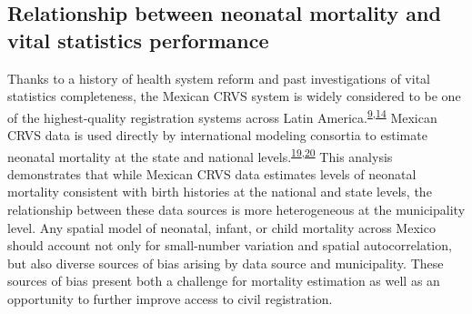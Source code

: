 \documentclass[
]{article}
\begin{document}
\hypertarget{relationship-between-neonatal-mortality-and-vital-statistics-performance}{%
\subsection{Relationship between neonatal mortality and vital statistics performance}\label{relationship-between-neonatal-mortality-and-vital-statistics-performance}}

Thanks to a history of health system reform and past investigations of vital statistics completeness, the Mexican CRVS system is widely considered to be one of the highest-quality registration systems across Latin America.\textsuperscript{\protect\hyperlink{ref-Mikkelsen2015}{9},\protect\hyperlink{ref-Frenk2006}{14}} Mexican CRVS data is used directly by international modeling consortia to estimate neonatal mortality at the state and national levels.\textsuperscript{\protect\hyperlink{ref-UNInter-agencyGrouponMortalityEstimationUNIGME2020}{19},\protect\hyperlink{ref-Dicker2018}{20}} This analysis demonstrates that while Mexican CRVS data estimates levels of neonatal mortality consistent with birth histories at the national and state levels, the relationship between these data sources is more heterogeneous at the municipality level. Any spatial model of neonatal, infant, or child mortality across Mexico should account not only for small-number variation and spatial autocorrelation, but also diverse sources of bias arising by data source and municipality. These sources of bias present both a challenge for mortality estimation as well as an opportunity to further improve access to civil registration.
\end{document}
